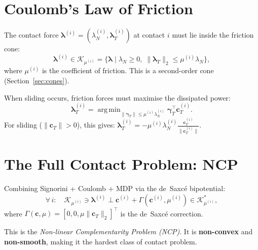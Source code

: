\documentclass[11pt,twoside]{report}
\theoremstyle{definition}
\theoremstyle{plain}
\theoremstyle{remark}
\newcommand{\0}{\bm{0}}
\newcommand{\Kc}{\mathcal{K}}
\DeclareMathOperator*{\argmin}{arg\,min}
\begin{document}
\section{Coulomb's Law of Friction}
\label{sec:coulomb}

\begin{definitionbox}
The contact force $\bm{\lambda}^{(i)}=(\lambda_{N}^{(i)},\bm{\lambda}_{T}^{(i)})$
at contact $i$ must lie inside the friction cone:
\begin{equation}\label{eq:friction-cone}
\bm{\lambda}^{(i)}\in\Kc_{\mu^{(i)}}
=\bigl\{\bm{\lambda}\;\big|\;\lambda_{N}\ge 0,\;
\|\bm{\lambda}_{T}\|_{2}\le\mu^{(i)}\lambda_{N}\bigr\},
\end{equation}
where $\mu^{(i)}$ is the coefficient of friction.
This is a second-order cone (Section~\ref{sec:cones}).
\end{definitionbox}

\begin{definitionbox}
When sliding occurs, friction forces must maximise the dissipated power:
\begin{equation}\label{eq:mdp}
\bm{\lambda}_{T}^{(i)}=\argmin_{\|\bm{\gamma}_{T}\|\le\mu^{(i)}\lambda_{N}^{(i)}}
\bm{\gamma}_{T}^{\!\top}\bm{c}_{T}^{(i)}.
\end{equation}
For sliding ($\|\bm{c}_{T}\|>0$), this gives:
$\bm{\lambda}_{T}^{(i)}=-\mu^{(i)}\lambda_{N}^{(i)}\frac{\bm{c}_{T}^{(i)}}{\|\bm{c}_{T}^{(i)}\|}.$
\end{definitionbox}

\section{The Full Contact Problem: NCP}
\label{sec:ncp}

Combining Signorini + Coulomb + MDP via the de~Saxc\'e bipotential:
\begin{equation}\label{eq:ncp}
\boxed{
\forall\,i:\quad
\Kc_{\mu^{(i)}}\ni\bm{\lambda}^{(i)}
\perp
\bm{c}^{(i)}+\Gamma(\bm{c}^{(i)},\mu^{(i)})
\in\Kc_{\mu^{(i)}}^{*},
}
\end{equation}
where $\Gamma(\bm{c},\mu)=[0,0,\mu\|\bm{c}_{T}\|_{2}]^{\!\top}$
is the de~Saxc\'e correction.

This is the \emph{Non-linear Complementarity Problem (NCP)}.
It is \textbf{non-convex} and \textbf{non-smooth}, making it
the hardest class of contact problem.
\end{document}
